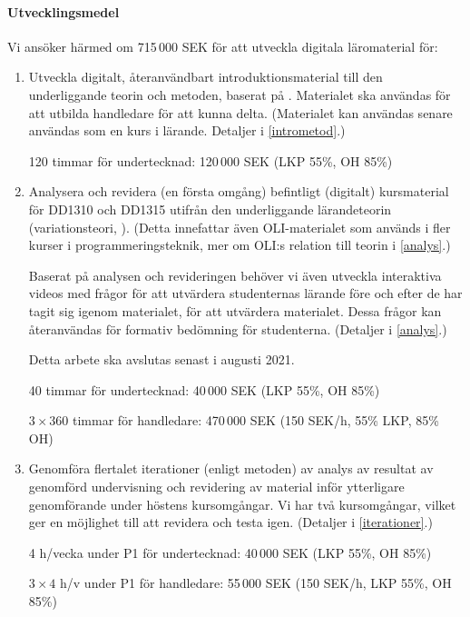 \documentclass[a4paper,swedish]{article}
\begin{document}
\paragraph{Utvecklingsmedel} Vi ansöker härmed om 715\,000 SEK för att utveckla 
digitala läromaterial för:
\begin{enumerate}
  \item Utveckla digitalt, återanvändbart introduktionsmaterial till den 
    underliggande teorin och metoden, baserat på 
    \textcite{NecessaryConditionsOfLearning}. Materialet ska användas för att 
    utbilda handledare för att kunna delta.
    (Materialet kan användas senare användas som en kurs i lärande.
    Detaljer i \cref{intrometod}.)

    120 timmar för undertecknad: 120\,000 SEK (LKP 55\%, OH 85\%)

  \item Analysera och revidera (en första omgång) befintligt (digitalt) 
    kursmaterial för DD1310 och DD1315 utifrån den underliggande lärandeteorin 
    (variationsteori, \cite{NecessaryConditionsOfLearning}). (Detta innefattar 
    även OLI-materialet som används i fler kurser i programmeringsteknik, mer 
    om OLI:s relation till teorin i \cref{analys}.)
    
    Baserat på analysen och revideringen behöver vi även utveckla interaktiva 
    videos med frågor för att utvärdera studenternas lärande före och efter de 
    har tagit sig igenom materialet, för att utvärdera materialet. Dessa frågor 
    kan återanvändas för formativ bedömning för studenterna.
    (Detaljer i \cref{analys}.)

    Detta arbete ska avslutas senast i augusti 2021.

    40 timmar för undertecknad: 40\,000 SEK (LKP 55\%, OH 85\%)

    \(3\times 360\) timmar för handledare: 470\,000 SEK (150 SEK/h, 55\% LKP, 
    85\% OH)

  \item Genomföra flertalet iterationer (enligt metoden) av analys av resultat 
    av genomförd undervisning och revidering av material inför ytterligare 
    genomförande under höstens kursomgångar. Vi har två kursomgångar, vilket 
    ger en möjlighet till att revidera och testa igen.
    (Detaljer i \cref{iterationer}.)

    4 h/vecka under P1 för undertecknad: 40\,000 SEK (LKP 55\%, OH 85\%)

    \(3\times 4\) h/v under P1 för handledare: 55\,000 SEK (150 SEK/h, LKP 
    55\%, OH 85\%)
\end{enumerate} 
\end{document}
